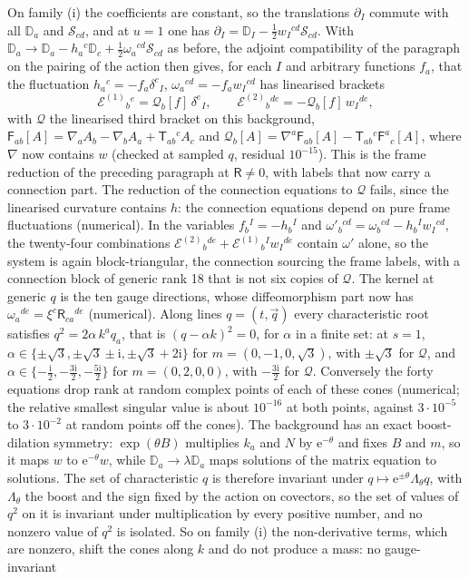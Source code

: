 On family (i) the coefficients are constant, so the translations \(\partial_I\) commute with all \(\mathbb D_a\) and \(\mathcal S_{cd}\), and at \(u=1\) one has \(\partial_I=\mathbb D_I-\tfrac12w_I{}^{cd}\mathcal S_{cd}\). With \(\mathbb D_a\to\mathbb D_a-h_a{}^c\mathbb D_c+\tfrac12\omega_a{}^{cd}\mathcal S_{cd}\) as before, the adjoint compatibility of the paragraph on the pairing of the action then gives, for each \(I\) and arbitrary functions \(f_a\), that the fluctuation \(h_a{}^c=-f_a\delta^c{}_I\), \(\omega_a{}^{cd}=-f_aw_I{}^{cd}\) has linearised brackets
\[
\mathcal E^{(1)}{}_b{}^e=\mathcal Q_b[f]\,\delta^e{}_I,\qquad
\mathcal E^{(2)}{}_b{}^{de}=-\mathcal Q_b[f]\,w_I{}^{de},
\]
with \(\mathcal Q\) the linearised third bracket on this background, \(\mathsf F_{ab}[A]=\nabla_aA_b-\nabla_bA_a+\mathsf T_{ab}{}^cA_c\) and \(\mathcal Q_b[A]=\nabla^a\mathsf F_{ab}[A]-\mathsf T_{ab}{}^c\mathsf F^a{}_c[A]\), where \(\nabla\) now contains \(w\) (checked at sampled \(q\), residual \(10^{-15}\)). This is the frame reduction of the preceding paragraph at \(\mathsf R\neq0\), with labels that now carry a connection part. The reduction of the connection equations to \(\mathcal Q\) fails, since the linearised curvature contains \(h\): the connection equations depend on pure frame fluctuations (numerical). In the variables \(f_b{}^I=-h_b{}^I\) and \(\omega'_b{}^{cd}=\omega_b{}^{cd}-h_b{}^Iw_I{}^{cd}\), the twenty-four combinations \(\mathcal E^{(2)}{}_b{}^{de}+\mathcal E^{(1)}{}_b{}^Iw_I{}^{de}\) contain \(\omega'\) alone, so the system is again block-triangular, the connection sourcing the frame labels, with a connection block of generic rank 18 that is not six copies of \(\mathcal Q\). The kernel at generic \(q\) is the ten gauge directions, whose diffeomorphism part now has \(\omega_a{}^{de}=\xi^c\mathsf R_{ca}{}^{de}\) (numerical). Along lines \(q=(t,\vec q)\) every characteristic root satisfies \(q^2=2\alpha\,k^aq_a\), that is \((q-\alpha k)^2=0\), for \(\alpha\) in a finite set: at \(s=1\), \(\alpha\in\{\pm\sqrt3,\pm\sqrt3\pm\mathrm i,\pm\sqrt3+2\mathrm i\}\) for \(m=(0,-1,0,\sqrt3)\), with \(\pm\sqrt3\) for \(\mathcal Q\), and \(\alpha\in\{-\tfrac{\mathrm i}2,-\tfrac{3\mathrm i}2,-\tfrac{5\mathrm i}2\}\) for \(m=(0,2,0,0)\), with \(-\tfrac{3\mathrm i}2\) for \(\mathcal Q\). Conversely the forty equations drop rank at random complex points of each of these cones (numerical; the relative smallest singular value is about \(10^{-16}\) at both points, against \(3\cdot10^{-5}\) to \(3\cdot10^{-2}\) at random points off the cones). The background has an exact boost-dilation symmetry: \(\exp(\theta B)\) multiplies \(k_a\) and \(N\) by \(\mathrm e^{-\theta}\) and fixes \(B\) and \(m\), so it maps \(w\) to \(\mathrm e^{-\theta}w\), while \(\mathbb D_a\to\lambda\mathbb D_a\) maps solutions of the matrix equation to solutions. The set of characteristic \(q\) is therefore invariant under \(q\mapsto\mathrm e^{\pm\theta}\Lambda_\theta q\), with \(\Lambda_\theta\) the boost and the sign fixed by the action on covectors, so the set of values of \(q^2\) on it is invariant under multiplication by every positive number, and no nonzero value of \(q^2\) is isolated. So on family (i) the non-derivative terms, which are nonzero, shift the cones along \(k\) and do not produce a mass: no gauge-invariant 